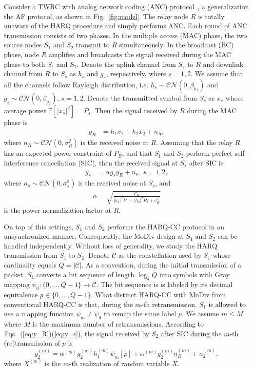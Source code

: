 \documentclass[journal]{IEEEtran}
\begin{document}
Consider a TWRC with analog network coding (ANC) protocol~\cite{choi2013energy}, 
a generalization the AF protocol, as shown in Fig.~\ref{fig:model}. The relay
node $R$ is totally unaware of the HARQ procedure and simply performs ANC. Each round of ANC
transmission consists of two phases. In the multiple access (MAC) phase, the
two source nodes $S_1$ and $S_2$ transmit to $R$ simultaneously. In the
broadcast (BC) phase, node $R$ amplifies and broadcasts the signal received
during the MAC phase to both $S_1$ and $S_2$.
Denote the uplink channel from $S_s$ to $R$ and downlink channel from $R$ to
$S_s$ as $h_s$ and $g_s$, respectively, where $s=1,2$. We assume that all
the channels follow Rayleigh distribution, i.e.
$h_s\sim\mathcal{CN}(0,\beta_{h_s})$ and $g_s\sim\mathcal{CN}(0,\beta_{g_s})$,
$s=1,2$. Denote the transmitted symbol from $S_s$ as $x_s$ whose average power
$\mathbb{E}[|x_s|^2]=P_s$. Then the signal received by $R$ during the MAC phase
is
\begin{align}
  y_R & = h_1x_1+h_2x_2+n_R,
  \label{eq:y_R}
\end{align}
where $n_R\sim\mathcal{CN}(0,\sigma_R^2)$ is the received noise at $R$. Assuming
that the relay $R$ has an expected power constraint of $P_R$, and that
$S_1$ and $S_2$ perform perfect self-interference cancellation (SIC), then the
received signal at $S_s$ after SIC is
\begin{align}
  y_s &= \alpha g_s y_R + n_s,\;s=1,2,
  \label{eq:y_s}
\end{align}
where $n_s\sim\mathcal{CN}(0,\sigma_s^2)$ is the received noise at $S_s$, and
\begin{align}
  \alpha = \sqrt{\frac{P_R}{|h_1|^2P_1 + |h_2|^2P_2+\sigma_R^2}}
\end{align}
is the power normalization factor at $R$.

On top of this settings, $S_1$ and $S_2$ performs the HARQ-CC protocol
in an unsynchronized manner. Consequently, the MoDiv design at $S_1$ and $S_2$
can be handled independently. Without loss of generality, we study the HARQ
transmission from $S_1$ to $S_2$. Denote $\mathcal{C}$ as the constellation used
by $S_1$ whose cardinality equals $Q=|\mathcal{C}|$. As a convention, during the
initial transmission of a packet, $S_1$ converts a bit sequence of length
$\log_2Q$ into symbols with Gray mapping $\psi_0:\{0,\ldots,Q - 1\}\rightarrow
\mathcal{C}$. The bit sequence is is labeled by its decimal equivalence $p\in
\{0,\ldots,Q - 1\}$. What distinct HARQ-CC with MoDiv from conventional HARQ-CC
is that, during the $m$-th retransmission, $S_1$ is allowed to use a
mapping function $\psi_m\not=\psi_0$ to remap the same label $p$. We assume
$m \leq M$ where $M$ is the maximum number of retransmissions. According to
Eqs.~(\ref{eq:y_R})(\ref{eq:y_s}), the signal received by $S_2$ after SIC during
the $m$-th (re)transmission of $p$ is
\begin{equation}
  y_2^{(m)} = \alpha^{(m)} g_2^{(m)}h_1^{(m)}\psi_m[p] +
  \alpha^{(m)} g_2^{(m)}n_R^{(m)} + n_2^{(m)},
\end{equation}
where $X^{(m)}$ is the $m$-th realization of random variable $X$.
\end{document}

